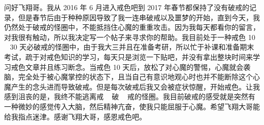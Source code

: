 \begin{case}
    问好飞翔哥。我从 2016 年 6 月进入戒色吧到 2017 年春节都保持了没有破戒的记录，但是春节后由于种种原因导致了我一连串破戒以及噩梦的开始，直到今天，我仍然处于破戒的怪圈中，不能抵挡住心魔的重重攻击。因为我每天都看你的留言，对我很有触动，所以我决定写一个帖子来寻求你的帮助。我目前处于一种戒色 10 ~ 30 天必破戒的怪圈中，由于我大三并且在准备考研，所以忙于补课和准备期末考试，疏于对戒色知识的学习，每天只是浏览一下贴吧，并没有拿出整块时间来学习戒色文章并且练习断念。当戒色 10 天后，放松了对心魔的警惕，心魔就会袭脑，完全处于被心魔掌控的状态下，且当自己有意识地观心时也并不能断除这个心魔产生的念头进而导致破戒。但是每次破戒后我又会被症状惊醒，开始戒色。让我感到沮丧的是，我终不能逃离戒 ~ 破 ~ 戒的怪圈。我目前破戒的感受就是突然有一种微妙的感觉传入大脑，然后精神亢奋，使我只能屈服于心魔。希望飞翔大哥能给我指点迷津。感谢飞翔大哥，感恩戒色吧。

\end{case}
